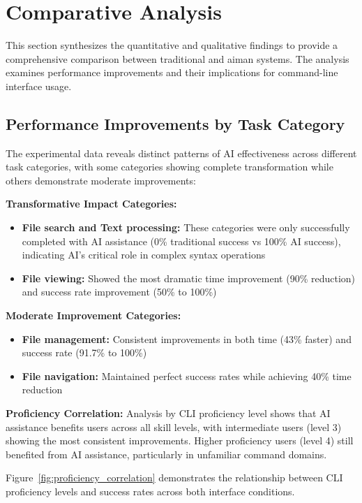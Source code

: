 \section{Comparative Analysis}

This section synthesizes the quantitative and qualitative findings to provide a comprehensive comparison between traditional and aiman systems. The analysis examines performance improvements and their implications for command-line interface usage.

\subsection{Performance Improvements by Task Category}

The experimental data reveals distinct patterns of AI effectiveness across different task categories, with some categories showing complete transformation while others demonstrate moderate improvements:

\textbf{Transformative Impact Categories:}
\begin{itemize}
	\item \textbf{File search and Text processing:} These categories were only successfully completed with AI assistance (0\% traditional success vs 100\% AI success), indicating AI's critical role in complex syntax operations
	\item \textbf{File viewing:} Showed the most dramatic time improvement (90\% reduction) and success rate improvement (50\% to 100\%)
\end{itemize}

\textbf{Moderate Improvement Categories:}
\begin{itemize}
	\item \textbf{File management:} Consistent improvements in both time (43\% faster) and success rate (91.7\% to 100\%)
	\item \textbf{File navigation:} Maintained perfect success rates while achieving 40\% time reduction
\end{itemize}

\textbf{Proficiency Correlation:} Analysis by CLI proficiency level shows that AI assistance benefits users across all skill levels, with intermediate users (level 3) showing the most consistent improvements. Higher proficiency users (level 4) still benefited from AI assistance, particularly in unfamiliar command domains.

Figure~\ref{fig:proficiency_correlation} demonstrates the relationship between CLI proficiency levels and success rates across both interface conditions.

